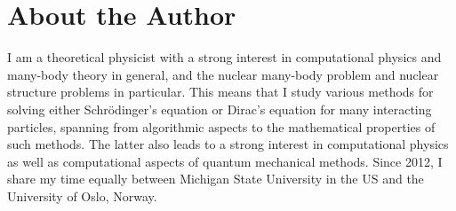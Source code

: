 \chapter*{About the Author}


I am  a theoretical physicist with a strong interest in computational physics and many-body theory in general, and the nuclear many-body problem and nuclear structure problems in particular. This means that I study various methods for solving either Schr\"odinger's equation or Dirac's equation for many interacting particles, spanning from algorithmic aspects to the mathematical properties of such methods. The latter also leads to a strong interest in computational physics as well as computational aspects of quantum mechanical methods. Since 2012, I share my time equally between Michigan State University in the US and the University of Oslo, Norway.

